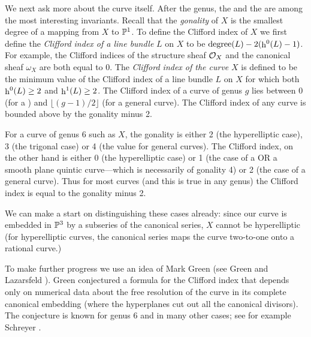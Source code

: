 We next ask more about the curve itself. After the genus,
the  and the  are
among the most interesting invariants.
Recall that the
{\it gonality\/} of $X$ is the smallest degree of a mapping from
$X$ to $\P^1$. To define the Clifford index
of $X$ 
we first define the {\it Clifford index of a line bundle\/} $L$
on $X$ to be
$\mathop{\rm degree}(L)-2(\mathop{\rm h}\nolimits^0(L)-1)$.
{}For example, the Clifford indices of the structure sheaf
$\cO_X$ and the canonical sheaf $\omega_X$ are both equal to 0.
The {\it Clifford index of the curve\/} 
$X$ is defined to be the minimum value
of the Clifford index of a line bundle $L$
on $X$ for which both
$\mathop{\rm h}\nolimits^0(L)\geq 2$ and $\mathop{\rm h}\nolimits^1(L)\geq 2$. 
The Clifford index of a curve of genus $g$
lies between 0 (for a )
 and
$\lfloor (g-1)/2\rfloor$ (for a general curve).
The Clifford index of any curve is bounded above
by the gonality minus 2.

{}For a curve of genus 6 such as $X$, the gonality is either
2 (the hyperelliptic case), 3 (the trigonal case) or 4
(the value for general curves). The Clifford index, on the
other hand is either 0 (the hyperelliptic case) or 1
(the case of a 
 OR a smooth 
 plane quintic curve---which
is necessarily of gonality 4)
or 2 (the case of a general curve). Thus for most curves 
(and this is true in any genus)
the Clifford index is equal to the gonality minus 2.

We can make a start on distinguishing these cases already:
since our curve is embedded in $\P^3$ by a subseries of the
canonical series, $X$ cannot be hyperelliptic (for hyperelliptic
curves, the canonical series maps the curve two-to-one onto
a rational curve.)

To make further progress we use an idea of Mark Green
(see Green and Lazarsfeld \cite{gl}). Green conjectured a formula
{}for the Clifford index that depends only on
numerical data about the free resolution of the
curve in its complete canonical embedding (where the hyperplanes
cut out all the canonical divisors). 
The conjecture is known for genus 6 and
in many other cases; see for example Schreyer \cite{s}.

